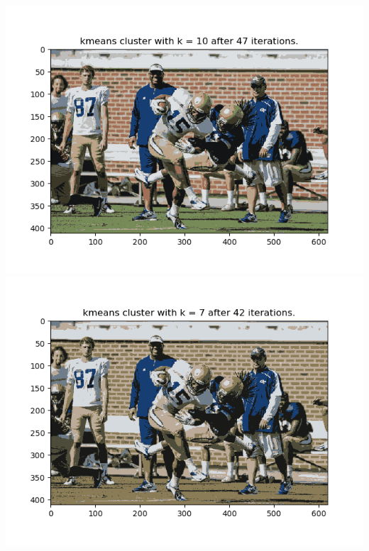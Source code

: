 \documentclass[twoside,10pt]{article}
\begin{document}
\begin{enumerate}
    \begin{center}\includegraphics[scale=0.5]{kmeans1.png}\includegraphics[scale=0.5]{homework1/kmeans2.png}\end{center}
\end{enumerate}
\end{document}
